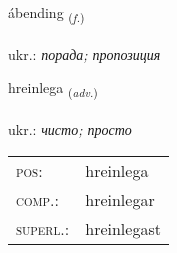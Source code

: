 \documentclass[frontgrid, backgrid]{flacards}\usepackage[]{graphicx}\usepackage[]{xcolor}
\begin{document}
\renewcommand{\blhead}{\vskip5pt {\small\bfseries\footnotesize Nafnorð | іменник }}
\renewcommand{\bcfoot}{\vskip5pt \hspace{2pt}{\small\bfseries\footnotesize 3K}}


{ábending \small{\textsubscript{(\textit{f.})}} \\[1ex] %
\textphonetic{[auːpɛntiŋk]} \\
ukr.: \emph{порада; пропозиция} \\  [2ex]
\renewcommand*{\arraystretch}{0.8}
}

\renewcommand{\flhead}{\vskip5pt \fboxsep=0pt {\small\bfseries\footnotesize Atviksorð | прислівник}}
\renewcommand{\fcfoot}{\vskip5pt \fboxsep=0pt \hspace{2pt}{\small\bfseries\footnotesize 3K}}

\renewcommand{\blhead}{\vskip5pt {\small\bfseries\footnotesize Atviksorð | прислівник }}
\renewcommand{\bcfoot}{\vskip5pt \hspace{2pt}{\small\bfseries\footnotesize 3K}}


{hreinlega \small{\textsubscript{(\textit{adv.})}} \\[1ex] %
\textphonetic{[r̥eiːnlɛɣa]} \\
ukr.: \emph{чисто; просто} \\  [2ex]
\renewcommand*{\arraystretch}{0.8}
\begin{tabular}{ll}
\textsc{pos}: & hreinlega \\ 
\textsc{comp.}: & hreinlegar \\ 
\textsc{superl.}: & hreinlegast \\
\end{tabular}
}

\renewcommand{\flhead}{\vskip5pt \fboxsep=0pt {\small\bfseries\footnotesize Lýsingarorð | прикметник}}
\renewcommand{\fcfoot}{\vskip5pt \fboxsep=0pt \hspace{2pt}{\small\bfseries\footnotesize 3K}}
\end{document}
